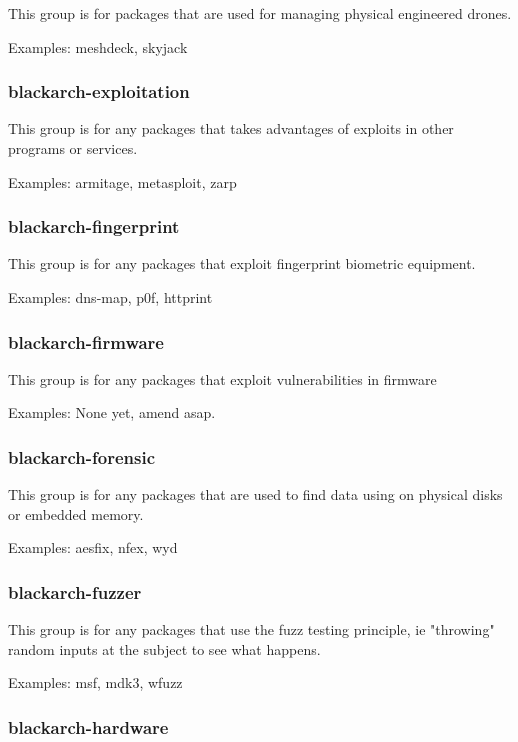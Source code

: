 \documentclass[a4paper, oneside, 11pt]{book}
\begin{document}
This group is for packages that are used for managing physical engineered drones.

Examples: meshdeck, skyjack

\subsubsection{blackarch-exploitation}

This group is for any packages that takes advantages of exploits in other programs or services.

Examples: armitage, metasploit, zarp

\subsubsection{blackarch-fingerprint}

This group is for any packages that exploit fingerprint biometric equipment.

Examples: dns-map, p0f, httprint

\subsubsection{blackarch-firmware}

This group is for any packages that exploit vulnerabilities in firmware

Examples: None yet, amend asap.

\subsubsection{blackarch-forensic}

This group is for any packages that are used to find data using on physical disks or embedded memory.

Examples: aesfix, nfex, wyd

\subsubsection{blackarch-fuzzer}

This group is for any packages that use the fuzz testing principle, ie "throwing" random inputs at the subject to see what happens.

Examples: msf, mdk3, wfuzz

\subsubsection{blackarch-hardware}
\end{document}
